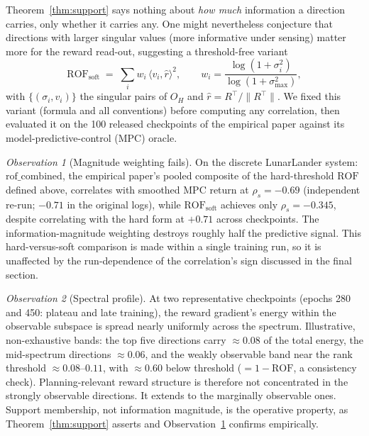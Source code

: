 \documentclass[11pt]{article}
\theoremstyle{remark}
\newtheorem{observation}{Observation}
\newcommand{\ROF}{\mathrm{ROF}}
\begin{document}
Theorem~\ref{thm:support} says nothing about \emph{how much} information a direction carries, only whether it carries any. One might nevertheless conjecture that directions with larger singular values (more informative under sensing) matter more for the reward read-out, suggesting a threshold-free variant
\[
\ROF_{\mathrm{soft}} \;=\; \sum_i w_i\, \langle v_i, \hat r\rangle^2,
\qquad w_i = \frac{\log(1+\sigma_i^2)}{\log(1+\sigma_{\max}^2)},
\]
with $\{(\sigma_i, v_i)\}$ the singular pairs of $O_H$ and $\hat r = R^\top/\lVert R^\top\rVert$. We fixed this variant (formula and all conventions) before computing any correlation, then evaluated it on the 100 released checkpoints of the empirical paper against its model-predictive-control (MPC) oracle.

\begin{observation}[Magnitude weighting fails]\label{obs:soft}
On the discrete LunarLander system: $\mathrm{rof\_combined}$, the empirical paper's pooled composite of the hard-threshold $\ROF$ defined above, correlates with smoothed MPC return at $\rho_s = -0.69$ (independent re-run; $-0.71$ in the original logs), while $\ROF_{\mathrm{soft}}$ achieves only $\rho_s = -0.345$, despite correlating with the hard form at $+0.71$ across checkpoints. The information-magnitude weighting destroys roughly half the predictive signal. This hard-versus-soft comparison is made within a single training run, so it is unaffected by the run-dependence of the correlation's sign discussed in the final section.
\end{observation}

\begin{observation}[Spectral profile]\label{obs:spectrum}
At two representative checkpoints (epochs 280 and 450: plateau and late training), the reward gradient's energy within the observable subspace is spread nearly uniformly across the spectrum. Illustrative, non-exhaustive bands: the top five directions carry $\approx 0.08$ of the total energy, the mid-spectrum directions $\approx 0.06$, and the weakly observable band near the rank threshold $\approx 0.08$--$0.11$, with $\approx 0.60$ below threshold ($=1-\ROF$, a consistency check). Planning-relevant reward structure is therefore not concentrated in the strongly observable directions. It extends to the marginally observable ones. Support membership, not information magnitude, is the operative property, as Theorem~\ref{thm:support} asserts and Observation~\ref{obs:soft} confirms empirically.
\end{observation}
\end{document}
